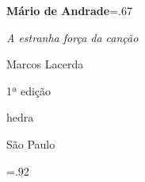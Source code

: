 




\begingroup\thispagestyle{empty}\vspace*{-.01\textheight}\parindent=0pt 
              \formular
              \Huge 
              \textbf{Mário de Andrade}\baselineskip=.67\baselineskip 

              \smaller[3]\textit{A estranha força da canção}
              \vspace{15mm}
              
              \LARGE
              Marcos Lacerda
              
              \vspace{5cm}

              \newfontfamily{}
              
              {\selectfont\minion\footnotesize
              1ª edição}
                    
              \vfill

              \newfontfamily{}
              {\fontsize{30}{40}\selectfont \timesnewroman hedra}
              
              \medskip

              {\selectfont\minion\small
              São Paulo \quad\the\year}
\endgroup
\pagebreak

\begingroup 

\footnotesize\parindent0pt\parskip5pt\thispagestyle{empty} 
\vspace*{.1\textheight}\mbox{} \vfill
\baselineskip=.92\baselineskip
\thispagestyle{empty}

